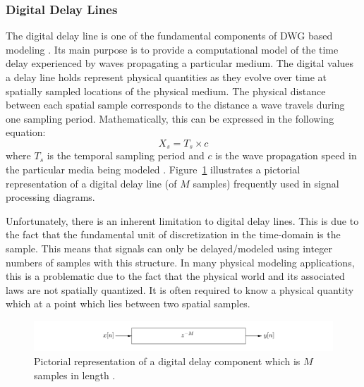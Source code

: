 \documentclass[main.tex]{subfiles}
\begin{document}
\subsubsection{Digital Delay Lines}
The digital delay line is one of the fundamental components of DWG based modeling . Its main purpose is to provide a computational model of the time delay experienced by waves propagating a particular medium. The digital values a delay line holds represent physical quantities as they evolve over time at spatially sampled locations of the physical medium. The physical distance between each spatial sample corresponds to the distance a wave travels during one sampling period. Mathematically, this can be expressed in the following equation:
\begin{equation}
    X_s = T_s \times c
\end{equation}
where $T_s$ is the temporal sampling period and $c$ is the wave propagation speed in the particular media being modeled . Figure~\ref{fig:digitalDelayLine} illustrates a pictorial representation of a digital delay line (of $M$ samples) frequently used in signal processing diagrams.

Unfortunately, there is an inherent limitation to digital delay lines. This is due to the fact that the fundamental unit of discretization in the time-domain is the sample. This means that signals can only be delayed/modeled using integer numbers of samples with this structure. In many physical modeling applications, this is a problematic due to the fact that the physical world and its associated laws are not spatially quantized. It is often required to know a physical quantity which at a point which lies between two spatial samples.

\begin{figure}[h]
    \centering
    \includegraphics[scale=.25]{./images/diagrams/digitalDelayLine.png}
    \caption{Pictorial representation of a digital delay component which is $M$ samples in length .}
    \label{fig:digitalDelayLine}
\end{figure}
\end{document}
